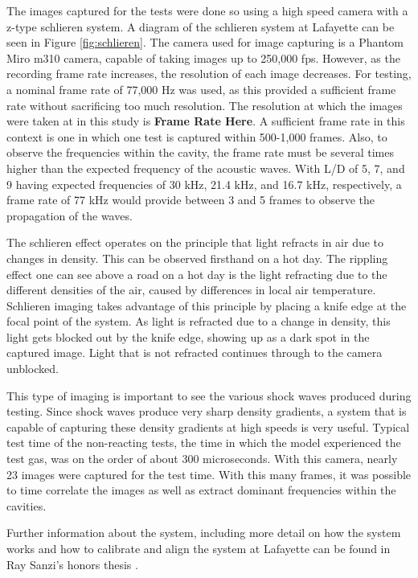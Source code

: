 The images captured for the tests were done so using a high speed camera with a z-type schlieren system. A diagram of the schlieren system at Lafayette can be seen in Figure \ref{fig:schlieren}. The camera used for image capturing is a Phantom Miro m310 camera, capable of taking images up to 250,000 fps. However, as the recording frame rate increases, the resolution of each image decreases. For testing, a nominal frame rate of 77,000 Hz was used, as this provided a sufficient frame rate without sacrificing too much resolution. The resolution at which the images were taken at in this study is \textbf{Frame Rate Here}. A sufficient frame rate in this context is one in which one test is captured within 500-1,000 frames. Also, to observe the frequencies within the cavity, the frame rate must be several times higher than the expected frequency of the acoustic waves. With L/D of 5, 7, and 9 having expected frequencies of 30 kHz, 21.4 kHz, and 16.7 kHz, respectively, a frame rate of 77 kHz would provide between 3 and 5 frames to observe the propagation of the waves.

The schlieren effect operates on the principle that light refracts in air due to changes in density. This can be observed firsthand on a hot day. The rippling effect one can see above a road on a hot day is the light refracting due to the different densities of the air, caused by differences in local air temperature. Schlieren imaging takes advantage of this principle by placing a knife edge at the focal point of the system. As light is refracted due to a change in density, this light gets blocked out by the knife edge, showing up as a dark spot in the captured image. Light that is not refracted continues through to the camera unblocked. 

This type of imaging is important to see the various shock waves produced during testing. Since shock waves produce very sharp density gradients, a system that is capable of capturing these density gradients at high speeds is very useful. Typical test time of the non-reacting tests, the time in which the model experienced the test gas,  was on the order of about 300 microseconds. With this camera, nearly 23 images were captured for the test time.  With this many frames, it was possible to time correlate the images as well as extract dominant frequencies within the cavities.

Further information about the system, including more detail on how the system works and how to calibrate and align the system at Lafayette can be found in Ray Sanzi's honors thesis \cite{Sanzi2016}.




